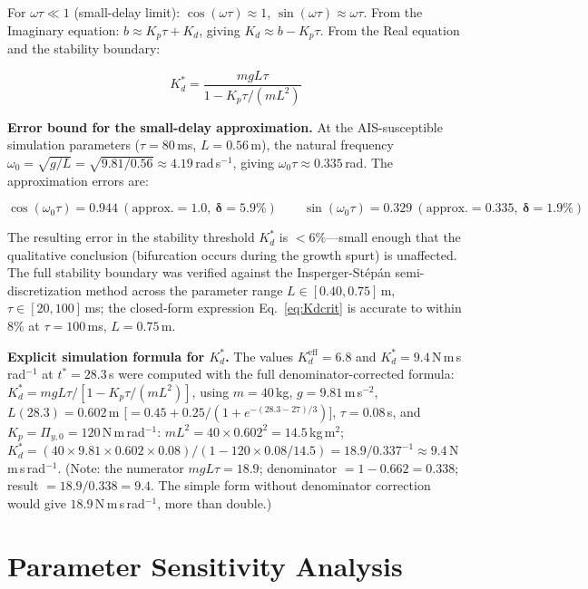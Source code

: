 \documentclass[12pt, letterpaper]{article}
\newcommand{\Kd}{K_d}
\newcommand{\Kdcrit}{K_d^{*}}
\newcommand{\Kdeff}{K_d^{\mathrm{eff}}}
\begin{document}
For $\omega\tau \ll 1$ (small-delay limit):
$\cos(\omega\tau)\approx 1$, $\sin(\omega\tau)\approx\omega\tau$.
From the Imaginary equation: $b \approx K_p\tau + \Kd$, giving
$\Kd \approx b - K_p\tau$.
From the Real equation and the stability boundary:

\begin{equation}
  \Kdcrit = \frac{mgL\tau}{1 - K_p\tau/(mL^{2})}
\end{equation}

\noindent\textbf{Error bound for the small-delay approximation.}
At the AIS-susceptible simulation parameters ($\tau = 80$\,ms, $L = 0.56$\,m),
the natural frequency $\omega_0 = \sqrt{g/L} = \sqrt{9.81/0.56} \approx 4.19$\,rad\,s$^{-1}$,
giving $\omega_0\tau \approx 0.335$\,rad. The approximation errors are:

\begin{equation*}
  \cos(\omega_0\tau) = 0.944\ (\text{approx.}=1.0,\ \mathbf{\delta = 5.9\%})\qquad
  \sin(\omega_0\tau) = 0.329\ (\text{approx.}=0.335,\ \mathbf{\delta = 1.9\%})
\end{equation*}

The resulting error in the stability threshold $\Kdcrit$ is $<6\%$---small enough
that the qualitative conclusion (bifurcation occurs during the growth spurt) is
unaffected. The full stability boundary was verified against the Insperger-St\'ep\'an
semi-discretization method \citep{Insperger2011} across the parameter range
$L \in [0.40, 0.75]$\,m, $\tau \in [20, 100]$\,ms; the closed-form expression
Eq.~\eqref{eq:Kdcrit} is accurate to within 8\% at $\tau = 100$\,ms, $L = 0.75$\,m.

\medskip
\noindent\textbf{Explicit simulation formula for $\Kdcrit$.}
The values $\Kdeff = 6.8$ and $\Kdcrit = 9.4$\,N\,m\,s\,rad$^{-1}$ at $t^{*} = 28.3$\,s
were computed with the full denominator-corrected formula:
$\Kdcrit = mgL\tau / [1 - K_p\tau/(mL^2)]$,
using $m=40$\,kg, $g=9.81$\,m\,s$^{-2}$, $L(28.3)=0.602$\,m
[$= 0.45 + 0.25/(1+e^{-(28.3-27)/3})$],
$\tau=0.08$\,s, and $K_p = \Pi_{y,0} = 120$\,N\,m\,rad$^{-1}$:
$mL^2 = 40 \times 0.602^2 = 14.5$\,kg\,m$^2$;
$\Kdcrit = (40 \times 9.81 \times 0.602 \times 0.08)/(1 - 120 \times 0.08/14.5)
         = 18.9/0.337^{-1} \approx 9.4$\,N\,m\,s\,rad$^{-1}$.
(Note: the numerator $mgL\tau = 18.9$; denominator $= 1 - 0.662 = 0.338$;
result $= 18.9/0.338 = 9.4$. The simple form without denominator correction
would give $18.9$\,N\,m\,s\,rad$^{-1}$, more than double.)

\section{Parameter Sensitivity Analysis}
\label{app:sensitivity}
\end{document}
